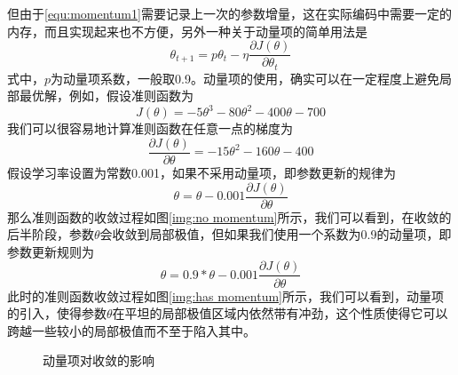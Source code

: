 但由于\eqref{equ:momentum1}需要记录上一次的参数增量，这在实际编码中需要一定的内存，而且实现起来也不方便，另外一种关于动量项的简单用法是
\begin{equation}
\theta_{t+1} = p\theta_t - \eta\frac{\partial J(\theta)}{ \partial \theta_t}
\end{equation}
式中，$p$为动量项系数，一般取0.9。动量项的使用，确实可以在一定程度上避免局部最优解，例如，假设准则函数为
\begin{equation}
J(\theta) = -5\theta^3 - 80\theta^2 - 400\theta - 700
\end{equation}
我们可以很容易地计算准则函数在任意一点的梯度为
\begin{equation}
\frac{\partial J(\theta)}{ \partial \theta} = -15\theta^2 - 160\theta - 400
\end{equation}
假设学习率设置为常数0.001，如果不采用动量项，即参数更新的规律为
\begin{equation}
\theta =\theta - 0.001\frac{\partial J(\theta)}{ \partial \theta} 
\end{equation}
那么准则函数的收敛过程如图\ref{img:no momentum}所示，我们可以看到，在收敛的后半阶段，参数$\theta$会收敛到局部极值，但如果我们使用一个系数为0.9的动量项，即参数更新规则为
\begin{equation}
\theta =0.9 * \theta - 0.001\frac{\partial J(\theta)}{ \partial \theta} 
\end{equation}
此时的准则函数收敛过程如图\ref{img:has momentum}所示，我们可以看到，动量项的引入，使得参数$\theta$在平坦的局部极值区域内依然带有冲劲，这个性质使得它可以跨越一些较小的局部极值而不至于陷入其中。
\begin{figure}[htbp]
\centering
\subfigure{\label{img:no momentum}}\addtocounter{subfigure}{-2}
\subfigure{\label{img:has momentum}}\addtocounter{subfigure}{-2}
\caption{动量项对收敛的影响}
\vspace{-1em}
\end{figure}

